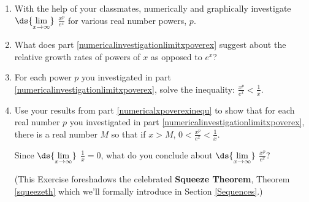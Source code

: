 \documentclass{ximera}
\begin{document}
\begin{problem}\label{powerexponentialgrowthex} 

\begin{enumerate} \item\label{numericalinvestigationlimitxpoverex} With the help of your classmates, numerically and graphically investigate $\ds{\lim_{x \rightarrow \infty}}$ $\frac{x^{p}}{e^{x}}$ for various real number powers, $p$.

\item  What does part \ref{numericalinvestigationlimitxpoverex} suggest about the relative growth rates of powers of $x$ as opposed to $e^{x}$?

\item\label{numericalxpoverexinequ}  For each power $p$ you investigated in part \ref{numericalinvestigationlimitxpoverex}, solve the inequality:  $\frac{x^{p}}{e^{x}} < \frac{1}{x}$. 

\item  Use your results from part \ref{numericalxpoverexinequ} to show that for each real number $p$ you investigated in part \ref{numericalinvestigationlimitxpoverex}, there is a real number $M$ so that if $x > M$, $0 < \frac{x^{p}}{e^{x}} < \frac{1}{x}$.  


Since  $\ds{\lim_{x \rightarrow \infty}}$ $\frac{1}{x} = 0$,  what do you conclude about $\ds{\lim_{x \rightarrow \infty}}$  $\frac{x^{p}}{e^{x}}$? 

 (This Exercise foreshadows the celebrated \textbf{Squeeze Theorem}, Theorem \ref{squeezeth}  which we'll formally introduce in Section \ref{Sequences}.)

\end{enumerate}  
\end{problem}
\end{document}
